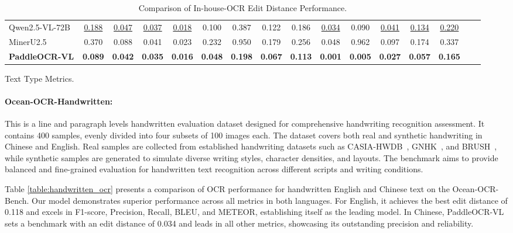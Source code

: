 \documentclass[11pt, a4paper,logo,  copyright, nonumbering]{paddleocr}
\begin{document}
\begin{table}[H]
\begin{subtable}[t]{1\textwidth}
{\begin{tabular}{l|ccccccccccccccc}
    Qwen2.5-VL-72B~\cite{bai2025qwen2} &\cellcolor{cyan!15}\underline{ 0.188} & \cellcolor{cyan!15}\underline{0.047} & \cellcolor{cyan!15}\underline{0.037} & \cellcolor{cyan!15}\underline{0.018} & 0.100 & 0.387 & 0.122 & 0.186 & \cellcolor{cyan!15}\underline{0.034} & 0.090 & \cellcolor{cyan!15}\underline{0.041} & \cellcolor{cyan!15}\underline{0.134} & \cellcolor{cyan!15}\underline{0.220} \\
      MinerU2.5~\cite{niu2025mineru2} & 0.370 & 0.088 & 0.041 & 0.023 & 0.232 & 0.950 & 0.179 & 0.256 & 0.048 & 0.962 & 0.097 & 0.174 & 0.337 \\
    \textbf{ PaddleOCR-VL} & \cellcolor{red!15}\textbf {0.089} & \cellcolor{red!15}\textbf {0.042} & \cellcolor{red!15}\textbf {0.035} & \cellcolor{red!15}\textbf {0.016} & \cellcolor{red!15}\textbf {0.048} & \cellcolor{red!15}\textbf {0.198} & \cellcolor{red!15}\textbf {0.067} & \cellcolor{red!15}\textbf {0.113} & \cellcolor{red!15}\textbf {0.001} & \cellcolor{red!15}\textbf {0.005} & \cellcolor{red!15}\textbf {0.027} & \cellcolor{red!15}\textbf {0.057} & \cellcolor{red!15}\textbf {0.165} \\
    \bottomrule
  \end{tabular}
  }
  \caption{Text Type Metrics.}  
  \label{tab:performance_text_type}
  
\end{subtable}
   \caption{Comparison of In-house-OCR Edit Distance Performance.}
 \label{tab:performance_comparison}
   

\end{table}

\paragraph{Ocean-OCR-Handwritten:} This is a line and paragraph levels handwritten evaluation dataset designed for comprehensive handwriting recognition assessment. It contains 400 samples, evenly divided into four subsets of 100 images each. The dataset covers both real and synthetic handwriting in Chinese and English. Real samples are collected from established handwriting datasets such as CASIA-HWDB~\cite{liu2011casia}, GNHK~\cite{lee2021gnhk}, and BRUSH~\cite{kotani2020generating}, while synthetic samples are generated to simulate diverse writing styles, character densities, and layouts. The benchmark aims to provide balanced and fine-grained evaluation for handwritten text recognition across different scripts and writing conditions.

Table \ref{table:handwritten_ocr} presents a comparison of OCR performance for handwritten English and Chinese text on the Ocean-OCR-Bench. Our model demonstrates superior performance across all metrics in both languages. For English, it achieves the best edit distance of 0.118 and excels in F1-score, Precision, Recall, BLEU, and METEOR, establishing itself as the leading model. In Chinese, PaddleOCR-VL sets a benchmark with an edit distance of 0.034 and leads in all other metrics, showcasing its outstanding precision and reliability. 
\end{document}
